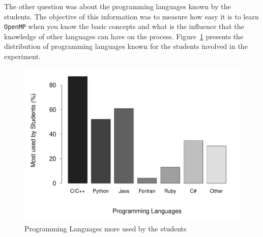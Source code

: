 The other question was about the programming languages known by the students. The objective of this information was to measure how easy it is to learn \texttt{OpenMP} when you know the basic concepts and what is the influence that the knowledge of other languages can have on the process. Figure~\ref{fig:LangMoreUsed} presents the distribution of programming languages known for the students involved in the experiment.

\begin{figure}[htpb]
\centering
\includegraphics[width=1.0\columnwidth,height=0.70\columnwidth, trim={0 1.0cm 0 1.5cm},clip]{figures/experienceLP.pdf}
\caption{Programming Languages more used by the students}
\label{fig:LangMoreUsed}
\end{figure}